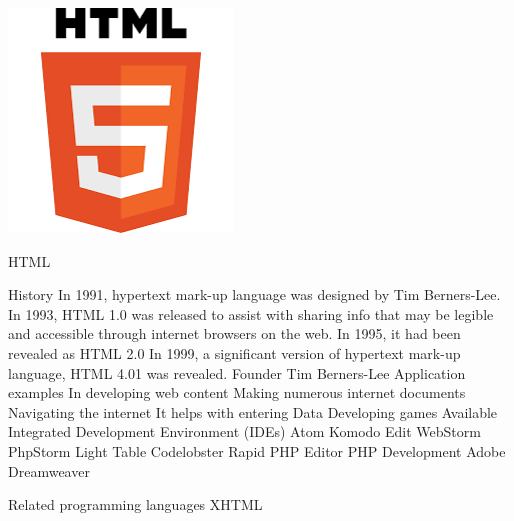 \documentclass{article}
\begin{document}
{\newpage
\includegraphics[width=\linewidth,height=\linewidth]{Picture1.png}
\centering
\begin{tcolorbox}[width=\linewidth,colback={blue},outer arc=0mm,colupper=white]    
	\huge HTML
\end{tcolorbox} 

\newpage
History
In 1991, hypertext mark-up language was designed by Tim Berners-Lee.
In 1993, HTML 1.0 was released to assist with sharing info that may be legible and accessible through internet browsers on the web.
In 1995, it had been revealed as HTML 2.0
In 1999, a significant version of hypertext mark-up language, HTML 4.01 was revealed.
Founder
Tim Berners-Lee
Application examples
In developing web content
Making numerous internet documents
Navigating the internet
It helps with entering Data
Developing games
Available Integrated Development Environment (IDEs) 
Atom
Komodo Edit
WebStorm
PhpStorm
Light Table
Codelobster
Rapid PHP Editor
PHP Development
Adobe Dreamweaver

Related programming languages
XHTML

}
\end{document}
